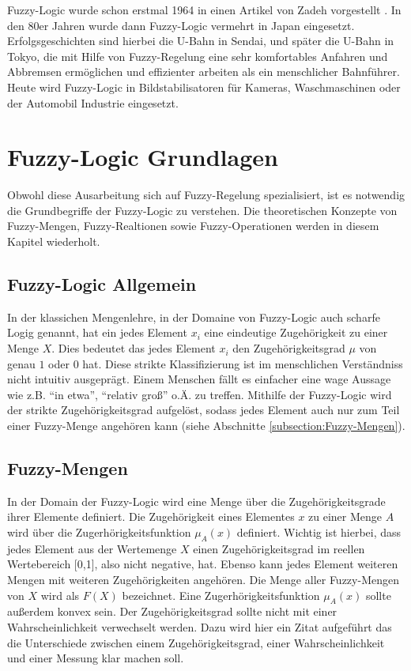 \documentclass[12pt,a4paper,bibliography=totocnumbered,listof=totocnumbered]{scrartcl}
\theoremstyle{Umgebung}
\begin{document}
Fuzzy-Logic wurde schon erstmal 1964 in einen Artikel von Zadeh vorgestellt \cite{ZZG84}. In den 80er Jahren wurde dann Fuzzy-Logic vermehrt in Japan eingesetzt. Erfolgsgeschichten sind hierbei die U-Bahn in Sendai, und später die U-Bahn in Tokyo, die mit Hilfe von Fuzzy-Regelung eine sehr komfortables Anfahren und Abbremsen ermöglichen und effizienter arbeiten als ein menschlicher Bahnführer. Heute wird Fuzzy-Logic in Bildstabilisatoren für Kameras, Waschmaschinen oder der Automobil Industrie eingesetzt.

\section{Fuzzy-Logic Grundlagen}

Obwohl diese Ausarbeitung sich auf Fuzzy-Regelung spezialisiert, ist es notwendig die Grundbegriffe der Fuzzy-Logic zu verstehen. Die theoretischen Konzepte von Fuzzy-Mengen, Fuzzy-Realtionen sowie Fuzzy-Operationen werden in diesem Kapitel wiederholt.

\subsection{Fuzzy-Logic Allgemein}

In der klassichen Mengenlehre, in der Domaine von Fuzzy-Logic auch scharfe Logig genannt, hat ein jedes Element $x_i$ eine eindeutige Zugehörigkeit zu einer Menge $X$. Dies bedeutet das jedes Element $x_i$ den Zugehörigkeitsgrad $\mu$ von genau $1$ oder $0$ hat. Diese strikte Klassifizierung ist im menschlichen Verständniss nicht intuitiv ausgeprägt. Einem Menschen fällt es einfacher eine wage Aussage wie z.B. \enquote{in etwa}, \enquote{relativ groß} o.Ä. zu treffen. Mithilfe der Fuzzy-Logic wird der strikte Zugehörigkeitsgrad aufgelöst, sodass jedes Element auch nur zum Teil einer Fuzzy-Menge angehören kann (siehe Abschnitte \ref{subsection:Fuzzy-Mengen}).

\label{subsection:Fuzzy-Mengen}
\subsection{Fuzzy-Mengen}

In der Domain der Fuzzy-Logic wird eine Menge über die Zugehörigkeitsgrade ihrer Elemente definiert. Die Zugehörigkeit eines Elementes $x$ zu einer Menge $A$ wird über die Zugerhörigkeitsfunktion $\mu_A(x)$ definiert. Wichtig ist hierbei, dass jedes Element aus der Wertemenge $X$ einen Zugehörigkeitsgrad im reellen Wertebereich [0,1], also nicht negative, hat. Ebenso kann jedes Element weiteren Mengen mit weiteren Zugehörigkeiten angehören. Die Menge aller Fuzzy-Mengen von $X$ wird als $F(X)$ bezeichnet. Eine Zugerhörigkeitsfunktion $\mu_A(x)$ sollte außerdem konvex sein. Der Zugehörigkeitsgrad sollte nicht mit einer Wahrscheinlichkeit verwechselt werden. Dazu wird hier ein Zitat aufgeführt das die Unterschiede zwischen einem Zugehörigkeitsgrad, einer Wahrscheinlichkeit und einer Messung klar machen soll.
\end{document}
